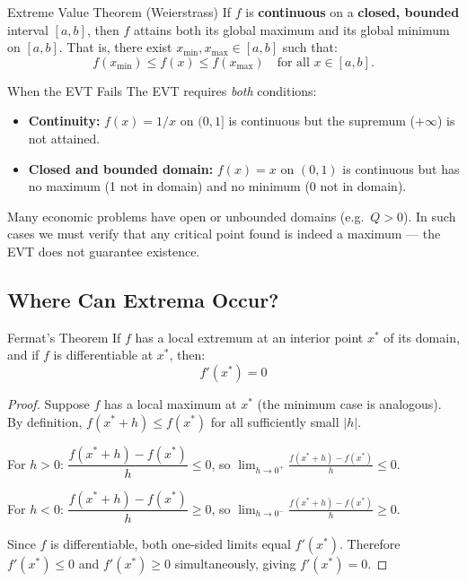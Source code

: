 \documentclass[12pt, a4paper]{article}
\theoremstyle{definition}
\newcommand{\limit}[2]{\lim_{#1 \to #2}}
\begin{document}
\begin{thmbox}{Extreme Value Theorem (Weierstrass)}
If $f$ is \textbf{continuous} on a \textbf{closed, bounded} interval
$[a, b]$, then $f$ attains both its global maximum and its global minimum
on $[a, b]$.  That is, there exist $x_{\min}, x_{\max} \in [a,b]$ such that:
\[
  f(x_{\min}) \leq f(x) \leq f(x_{\max})
  \quad \text{for all } x \in [a, b].
\]
\end{thmbox}

\begin{notebox}{When the EVT Fails}
The EVT requires \emph{both} conditions:
\begin{itemize}
  \item \textbf{Continuity:} $f(x) = 1/x$ on $(0,1]$ is continuous but the
        supremum ($+\infty$) is not attained.
  \item \textbf{Closed and bounded domain:} $f(x) = x$ on $(0,1)$ is
        continuous but has no maximum (1 not in domain) and no minimum
        (0 not in domain).
\end{itemize}
Many economic problems have open or unbounded domains (e.g.\ $Q > 0$).  In
such cases we must verify that any critical point found is indeed a maximum
--- the EVT does not guarantee existence.
\end{notebox}

\subsection{Where Can Extrema Occur?}

\begin{thmbox}{Fermat's Theorem}
If $f$ has a local extremum at an interior point $x^*$ of its domain, and if
$f$ is differentiable at $x^*$, then:
\[
  f'(x^*) = 0
\]
\end{thmbox}

\begin{proof}
Suppose $f$ has a local maximum at $x^*$ (the minimum case is analogous).
By definition, $f(x^*+h) \leq f(x^*)$ for all sufficiently small $|h|$.

For $h > 0$: $\dfrac{f(x^*+h) - f(x^*)}{h} \leq 0$, so
$\displaystyle\limit{h}{0^+}\frac{f(x^*+h)-f(x^*)}{h} \leq 0$.

For $h < 0$: $\dfrac{f(x^*+h) - f(x^*)}{h} \geq 0$, so
$\displaystyle\limit{h}{0^-}\frac{f(x^*+h)-f(x^*)}{h} \geq 0$.

Since $f$ is differentiable, both one-sided limits equal $f'(x^*)$.
Therefore $f'(x^*) \leq 0$ and $f'(x^*) \geq 0$ simultaneously,
giving $f'(x^*) = 0$.
\end{proof}
\end{document}
